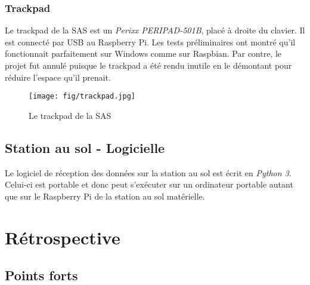 \subsubsection{Trackpad}

Le trackpad de la SAS est un \textit{Perixx PERIPAD-501B}, placé à droite du
clavier. Il est connecté par USB au Raspberry Pi. Les tests préliminaires ont
montré qu'il fonctionnait parfaitement sur Windows comme sur Raspbian. Par
contre, le projet fut annulé puisque le trackpad a été rendu inutile en le
démontant pour réduire l'espace qu'il prenait.

\begin{figure}[H]
	\center
	\texttt{[image: fig/trackpad.jpg]}
	\caption{Le trackpad de la SAS}
	\label{f:trackpad}
\end{figure}

\subsection{Station au sol - Logicielle}

Le logiciel de réception des données sur la station au sol est écrit en
\textit{Python 3}. Celui-ci est portable et donc peut s'exécuter sur un
ordinateur portable autant que sur le Raspberry Pi de la station au sol
matérielle.

\section{Rétrospective}

\subsection{Points forts}

